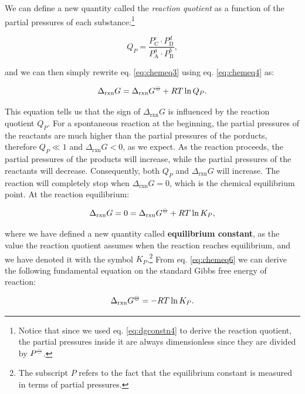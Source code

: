 \documentclass[
  9pt,
]{extbook}
\theoremstyle{definition}
\theoremstyle{definition}
\theoremstyle{definition}
\theoremstyle{remark}
\begin{document}
We can define a new quantity called the \emph{reaction quotient} as a function of the partial pressures of each substance:\footnote{Notice that since we used eq. \eqref{eq:dgconstn4} to derive the reaction quotient, the partial pressures inside it are always dimensionless since they are divided by \(P^{-\kern-6pt{\ominus}\kern-6pt-}\).}

\begin{equation}
Q_P = \frac{P_{\text{C}}^c \cdot P_{\text{D}}^d}{P_{\text{A}}^a \cdot P_{\text{B}}^b},
\label{eq:chemeq4}
\end{equation}

and we can then simply rewrite eq. \eqref{eq:chemeq3} using eq. \eqref{eq:chemeq4} as:

\begin{equation}
\Delta_{\text{rxn}} G = \Delta_{\text{rxn}} G^{-\kern-6pt{\ominus}\kern-6pt-}+ RT \ln Q_P.
\label{eq:chemeq5}
\end{equation}

This equation tells us that the sign of \(\Delta_{\text{rxn}} G\) is influenced by the reaction quotient \(Q_P\). For a spontaneous reaction at the beginning, the partial pressures of the reactants are much higher than the partial pressures of the porducts, therefore \(Q_P \ll 1\) and \(\Delta_{\text{rxn}} G < 0\), as we expect. As the reaction proceeds, the partial pressures of the products will increase, while the partial pressures of the reactants will decrease. Consequently, both \(Q_P\) and \(\Delta_{\text{rxn}} G\) will increase. The reaction will completely stop when \(\Delta_{\text{rxn}} G = 0\), which is the chemical equilibrium point. At the reaction equilibrium:

\begin{equation}
\Delta_{\text{rxn}} G = 0 = \Delta_{\text{rxn}} G^{-\kern-6pt{\ominus}\kern-6pt-}+ RT \ln K_P,
\label{eq:chemeq6}
\end{equation}

where we have defined a new quantity called \textbf{equilibrium constant}, as the value the reaction quotient assumes when the reaction reaches equilibrium, and we have denoted it with the symbol \(K_P\).\footnote{The subscript \(P\) refers to the fact that the equilibrium constant is measured in terms of partial pressures.} From eq. \eqref{eq:chemeq6} we can derive the following fundamental equation on the standard Gibbs free energy of reaction:

\begin{equation}
\Delta_{\text{rxn}} G^{-\kern-6pt{\ominus}\kern-6pt-}= - RT \ln K_P.
\label{eq:chemeqdg0}
\end{equation}
\end{document}

